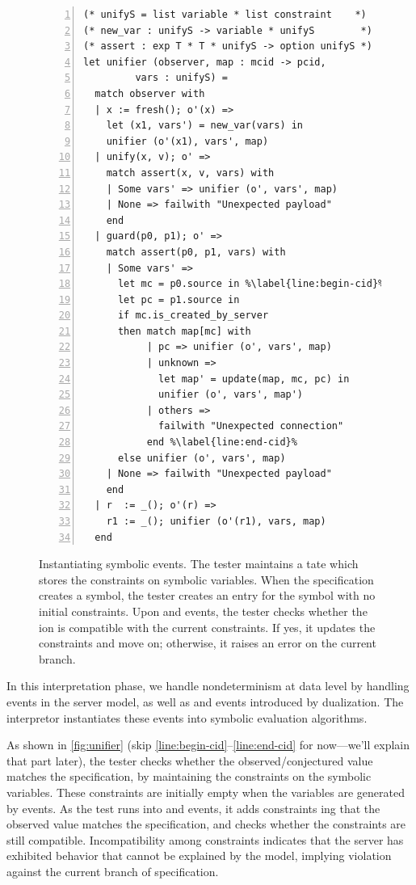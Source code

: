 \begin{figure}
  \begin{lstlisting}[style=customcoq,numbers=left,escapechar=\%]
(* unifyS = list variable * list constraint    *)
(* new_var : unifyS -> variable * unifyS        *)
(* assert : exp T * T * unifyS -> option unifyS *)
let unifier (observer, map : mcid -> pcid,
         vars : unifyS) =
  match observer with
  | x := fresh(); o'(x) =>
    let (x1, vars') = new_var(vars) in
    unifier (o'(x1), vars', map)
  | unify(x, v); o' =>
    match assert(x, v, vars) with
    | Some vars' => unifier (o', vars', map)
    | None => failwith "Unexpected payload"
    end
  | guard(p0, p1); o' =>
    match assert(p0, p1, vars) with
    | Some vars' =>
      let mc = p0.source in %\label{line:begin-cid}%
      let pc = p1.source in
      if mc.is_created_by_server
      then match map[mc] with
           | pc => unifier (o', vars', map)
           | unknown =>
             let map' = update(map, mc, pc) in
             unifier (o', vars', map')
           | others =>
             failwith "Unexpected connection"
           end %\label{line:end-cid}%
      else unifier (o', vars', map)
    | None => failwith "Unexpected payload"
    end
  | r  := _(); o'(r) =>
    r1 := _(); unifier (o'(r1), vars, map)
  end\end{lstlisting}
  \caption{Instantiating symbolic events.  The tester maintains a tate
    which stores the constraints on symbolic variables.  When the
    specification creates a  symbol, the tester creates an entry for
    the symbol with no initial constraints.  Upon  and
     events, the tester checks whether the ion is
    compatible with the current constraints.  If yes, it updates the constraints
    and move on; otherwise, it raises an error on the current branch.
  }
  \label{fig:unifier}
\end{figure}

In this interpretation phase, we handle nondeterminism at data level by handling
 events in the server model, as well as  and 
events introduced by dualization.  The interpretor instantiates these events
into symbolic evaluation algorithms.

As shown in \autoref{fig:unifier} (skip
\autoref{line:begin-cid}--\ref{line:end-cid} for now---we'll
explain that part later), the tester checks whether the observed/conjectured
value matches the specification, by maintaining the constraints on the symbolic
variables.  These constraints are initially empty when the variables are
generated by  events.  As the test runs into  and
 events, it adds constraints ing that the observed value
matches the specification, and checks whether the constraints are still
compatible.  Incompatibility among constraints indicates that the server has
exhibited behavior that cannot be explained by the model, implying violation
against the current branch of specification.

